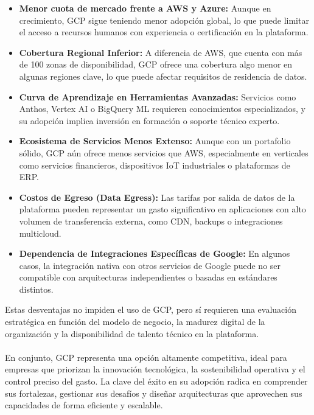 {                \begin{itemize}
                    \item \textbf{Menor cuota de mercado frente a AWS y Azure:} Aunque en crecimiento, GCP sigue teniendo menor adopción global, lo que puede limitar el acceso a recursos humanos con experiencia o certificación en la plataforma.
                    \item \textbf{Cobertura Regional Inferior:} A diferencia de AWS, que cuenta con más de 100 zonas de disponibilidad, GCP ofrece una cobertura algo menor en algunas regiones clave, lo que puede afectar requisitos de residencia de datos.
                    \item \textbf{Curva de Aprendizaje en Herramientas Avanzadas:} Servicios como Anthos, Vertex AI o BigQuery ML requieren conocimientos especializados, y su adopción implica inversión en formación o soporte técnico experto.
                    \item \textbf{Ecosistema de Servicios Menos Extenso:} Aunque con un portafolio sólido, GCP aún ofrece menos servicios que AWS, especialmente en verticales como servicios financieros, dispositivos IoT industriales o plataformas de ERP.
                    \item \textbf{Costos de Egreso (Data Egress):} Las tarifas por salida de datos de la plataforma pueden representar un gasto significativo en aplicaciones con alto volumen de transferencia externa, como CDN, backups o integraciones multicloud.
                    \item \textbf{Dependencia de Integraciones Específicas de Google:} En algunos casos, la integración nativa con otros servicios de Google puede no ser compatible con arquitecturas independientes o basadas en estándares distintos.
                \end{itemize}
                
                Estas desventajas no impiden el uso de GCP, pero sí requieren una evaluación estratégica en función del modelo de negocio, la madurez digital de la organización y la disponibilidad de talento técnico en la plataforma.
                
                \paragraph{} En conjunto, GCP representa una opción altamente competitiva, ideal para empresas que priorizan la innovación tecnológica, la sostenibilidad operativa y el control preciso del gasto. La clave del éxito en su adopción radica en comprender sus fortalezas, gestionar sus desafíos y diseñar arquitecturas que aprovechen sus capacidades de forma eficiente y escalable.
                
}
